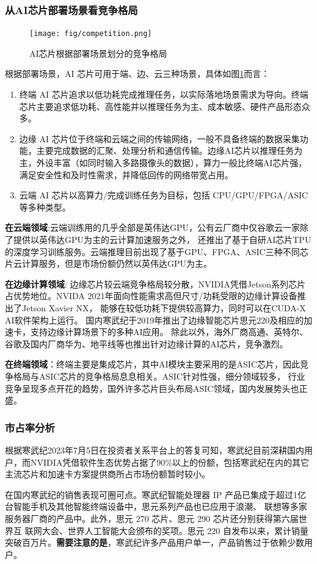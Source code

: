 \subsubsection{从AI芯片部署场景看竞争格局}
\begin{figure}[!htb]
  \centering
  \texttt{[image: fig/competition.png]}
  \caption{AI芯片根据部署场景划分的竞争格局}
  \label{competition}
\end{figure}
根据部署场景，AI 芯片可用于端、边、云三种场景，具体如图\ref{competition}而言：
\begin{enumerate}
  \item 终端 AI 芯片追求以低功耗完成推理任务，以实际落地场景需求为导向。终端芯片主要追求低功耗、高性能并以推理任务为主、成本敏感、硬件产品形态众多。
  \item 边缘 AI 芯片位于终端和云端之间的传输网络，一般不具备终端的数据采集功能，主要完成数据的汇聚、处理分析和通信传输。边缘AI芯片以推理任务为主，外设丰富（如同时输入多路摄像头的数据），算力一般比终端AI芯片强，满足安全性和及时性需求，并降低回传的网络带宽占用。
  \item 云端 AI 芯片以高算力/完成训练任务为目标，包括 CPU/GPU/FPGA/ASIC 等多种类型。
\end{enumerate}

\textbf{在云端领域}:云端训练用的几乎全部是英伟达GPU，公有云厂商中仅谷歌云一家除了提供以英伟达GPU为主的云计算加速服务之外，
还推出了基于自研AI芯片TPU的深度学习训练服务。云端推理目前出现了基于GPU、FPGA、ASIC三种不同芯片云计算服务，但是市场份额仍然以英伟达GPU为主。\par
\textbf{在边缘计算领域}:
边缘芯片较云端竞争格局较分散，NVIDIA凭借Jetson系列芯片占优势地位。NVIDA 2021年面向性能需求高但尺寸/功耗受限的边缘计算设备推出了Jetson Xavier NX，
能够在较低功耗下提供较高算力，同时可以在CUDA-X AI软件架构上运行。
国内寒武纪于2019年推出了边缘智能芯片思元220及相应的加速卡，支持边缘计算场景下的多种AI应用。
除此以外，海外厂商高通、英特尔、谷歌及国内厂商华为、地平线等也推出针对边缘计算的AI芯片，竞争激烈。\par
\textbf{在终端领域}：终端主要是集成芯片，其中AI模块主要采用的是ASIC芯片，因此竞争格局与ASIC芯片的竞争格局息息相关。ASIC针对性强，细分领域较多，
行业竞争呈现多点开花的趋势，国外许多芯片巨头布局ASIC领域，国内发展势头也正盛。
\subsubsection{市占率分析}
根据寒武纪2023年7月5日在投资者关系平台上的答复可知，寒武纪目前深耕国内用户，而NVIDIA凭借软件生态优势占据了$90\%$以上的份额，包括寒武纪在内的其它
主流芯片和加速卡方案提供商所占市场份额暂时较小。\par
在国内寒武纪的销售表现可圈可点。寒武纪智能处理器 IP 产品已集成于超过1亿台智能手机及其他智能终端设备中，思元系列产品也已应用于浪潮、
联想等多家服务器厂商的产品中。此外，思元 270 芯片、思元 290 芯片还分别获得第六届世界互
联网大会、世界人工智能大会颁布的奖项。思元 220 自发布以来，累计销量突破百万片。\textbf{需要注意的是}，寒武纪许多产品用户单一，产品销售过于依赖少数用户。\par

